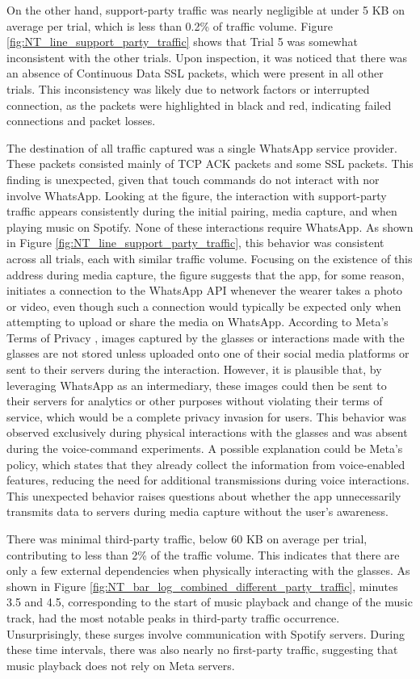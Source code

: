 On the other hand, support-party traffic was nearly negligible at under 5 KB on average per trial, which is less than 0.2\% of traffic volume. Figure \ref{fig:NT_line_support_party_traffic} shows that Trial 5 was somewhat inconsistent with the other trials. Upon inspection, it was noticed that there was an absence of Continuous Data SSL packets, which were present in all other trials. This inconsistency was likely due to network factors or interrupted connection, as the packets were highlighted in black and red, indicating failed connections and packet losses.

The destination of all traffic captured was a single WhatsApp service provider. These packets consisted mainly of TCP ACK packets and some SSL packets. This finding is unexpected, given that touch commands do not interact with nor involve WhatsApp. Looking at the figure, the interaction with support-party traffic appears consistently during the initial pairing, media capture, and when playing music on Spotify. None of these interactions require WhatsApp. As shown in Figure \ref{fig:NT_line_support_party_traffic}, this behavior was consistent across all trials, each with similar traffic volume. Focusing on the existence of this address during media capture, the figure suggests that the app, for some reason, initiates a connection to the WhatsApp API whenever the wearer takes a photo or video, even though such a connection would typically be expected only when attempting to upload or share the media on WhatsApp. According to Meta's Terms of Privacy \cite{MetaPrivacyPolicy}, images captured by the glasses or interactions made with the glasses are not stored unless uploaded onto one of their social media platforms or sent to their servers during the interaction. However, it is plausible that, by leveraging WhatsApp as an intermediary, these images could then be sent to their servers for analytics or other purposes without violating their terms of service, which would be a complete privacy invasion for users. This behavior was observed exclusively during physical interactions with the glasses and was absent during the voice-command experiments. A possible explanation could be Meta's policy, which states that they already collect the information from voice-enabled features, reducing the need for additional transmissions during voice interactions. This unexpected behavior raises questions about whether the app unnecessarily transmits data to servers during media capture without the user's awareness.


There was minimal third-party traffic, below 60 KB on average per trial, contributing to less than 2\% of the traffic volume. This indicates that there are only a few external dependencies when physically interacting with the glasses. As shown in Figure \ref{fig:NT_bar_log_combined_different_party_traffic}, minutes 3.5 and 4.5, corresponding to the start of music playback and change of the music track, had the most notable peaks in third-party traffic occurrence. Unsurprisingly, these surges involve communication with Spotify servers. During these time intervals, there was also nearly no first-party traffic, suggesting that music playback does not rely on Meta servers. 

